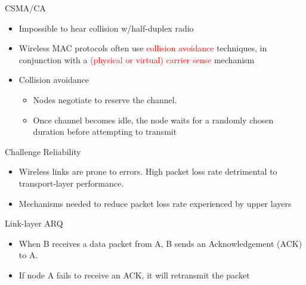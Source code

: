 \documentclass[pdf]{beamer}
\begin{document}
\begin{frame}{CSMA/CA}
  \begin{itemize}
  \item Impossible to hear collision w/half-duplex radio
  \item Wireless MAC protocols often use \textcolor{red}{collision avoidance}
    techniques, in conjunction with a \textcolor{red}{(physical or virtual) carrier
    sense} mechanism    
  \item Collision avoidance
    \begin{itemize}
    \item  Nodes negotiate to reserve the channel.     
    \item  Once channel becomes idle, the node waits for a randomly chosen
      duration before attempting to transmit
    \end{itemize}
  \end{itemize}
\end{frame}

\begin{frame}{Challenge Reliability}
  \begin{itemize}
  \item Wireless links are prone to errors. High packet loss rate detrimental to transport-layer performance.
  \item Mechanisms needed to reduce packet loss rate experienced by upper layers
  \end{itemize}
\end{frame}

\begin{frame}{Link-layer ARQ}
  \begin{itemize}
  \item When B receives a data packet from A, B sends an Acknowledgement (ACK) to A.
  \item If node A fails to receive an ACK, it will retransmit the packet
  \end{itemize}

  \begin{figure}
    \begin{center}
    \end{center}
  \end{figure}

\end{frame}
\end{document}

